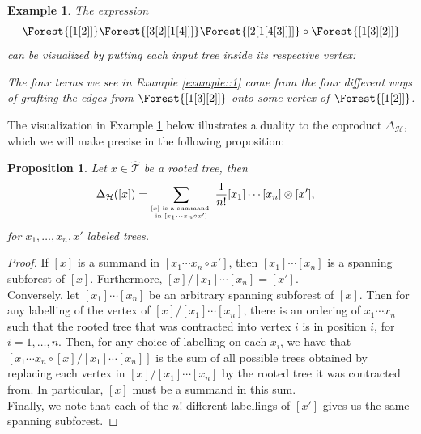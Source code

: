 \documentclass[10pt,a4paper]{article}
\newtheorem{proposition}[theorem]{Proposition}
\newtheorem{example}[theorem]{Example}
\begin{document}
\begin{example} \label{example::2}
The expression
\begin{align*}
\Forest{[1[2]]} \Forest{[3[2][1[4]]]}\Forest{[2[1[4[3]]]]} \circ \Forest{[1[3][2]]}
\end{align*}
can be visualized by putting each input tree inside its respective vertex:\\
\begin{center}
\end{center}

The four terms we see in Example \ref{example::1} come from the four different ways of grafting the edges from $\Forest{[1[3][2]]}$ onto some vertex of $\Forest{[1[2]]}$.
\end{example}

The visualization in Example \ref{example::2} below illustrates a duality to the coproduct $\Delta_{\mathcal{H}}$, which we will make precise in the following proposition:

\begin{proposition} \label{prop::1}
Let $x \in \hat{\mathcal{T}}$ be a rooted tree, then
\begin{align*}
\Delta_{\mathcal{H}}([x])=&\sum_{[x] \text{ is a summand } \atop \text{in } [x_1\cdots x_n \circ x']} \frac{1}{n!} [x_1]\cdots [x_n] \otimes [x'],
\end{align*}
for $x_1,\ldots,x_n,x'$ labeled trees.
\end{proposition}

\begin{proof}
If $[x]$ is a summand in $[x_1\cdots x_n \circ x']$, then $[x_1] \cdots [x_n]$ is a spanning subforest of $[x]$. Furthermore, $[x]/[x_1] \cdots [x_n] = [x']$. \\
Conversely, let $[x_1] \cdots [x_n]$ be an arbitrary spanning subforest of $[x]$. Then for any labelling of the vertex of $[x]/[x_1] \cdots [x_n]$, there is an ordering of $x_1 \cdots x_n$ such that the rooted tree that was contracted into vertex $i$ is in position $i$, for $i=1,\ldots,n$. Then, for any choice of labelling on each $x_i$, we have that $[x_1 \cdots x_n \circ [x]/[x_1] \cdots [x_n]]$ is the sum of all possible trees obtained by replacing each vertex in $[x]/[x_1] \cdots [x_n]$ by the rooted tree it was contracted from. In particular, $[x]$ must be a summand in this sum. \\
Finally, we note that each of the $n!$ different labellings of $[x']$ gives us the same spanning subforest.
\end{proof}
\end{document}
